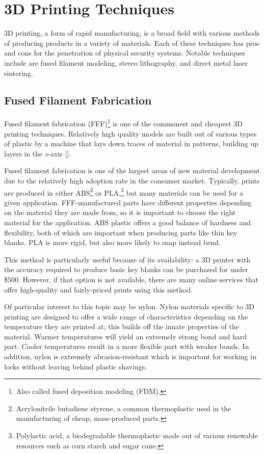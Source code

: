 \documentclass{acm_proc_article-sp}
\begin{document}
\section{3D Printing Techniques}
3D printing, a form of rapid manufacturing, is a broad field with various methods of producing products in a variety of materials. Each of these techniques has pros and cons for the penetration of physical security systems. Notable techniques include are fused filament modeling, stereo lithography, and direct metal laser sintering.

\subsection{Fused Filament Fabrication}
Fused filament fabrication (FFF)\footnote{Also called fused deposition modeling (FDM).} is one of the commonest and cheapest 3D printing techniques. Relatively high quality models are built out of various types of plastic by a machine that lays down traces of material in patterns, building up layers in the $z$-axis [\citealt{VALAVAARA}].

Fused filament fabrication is one of the largest areas of new material development due to the relatively high adoption rate in the consumer market. Typically, prints are produced in either ABS\footnote{Acrylonitrile butadiene styrene, a common thermoplastic used in the manufacturing of cheap, mass-produced parts.} or PLA,\footnote{Polylactic acid, a biodegradable thermoplastic made out of various renewable resources such as corn starch and sugar cane.} but many materials can be used for a given application. FFF-manufactured parts have different properties depending on the material they are made from, so it is important to choose the right material for the application. ABS plastic offers a good balance of hardness and flexibility, both of which are important when producing parts like thin key blanks. PLA is more rigid, but also more likely to snap instead bend.

This method is particularly useful because of its availability: a 3D printer with the accuracy required to produce basic key blanks can be purchased for under \$500. However, if that option is not available, there are many online services that offer high-quality and fairly-priced prints using this method.

Of particular interest to this topic may be nylon. Nylon materials specific to 3D printing are designed to offer a wide range of characteristics depending on the temperature they are printed at; this builds off the innate properties of the material. Warmer temperatures will yield an extremely strong bond and hard part. Cooler temperatures result in a more flexible part with weaker bonds. In addition, nylon is extremely abrasion-resistant which is important for working in locks without leaving behind plastic shavings.
\end{document}
